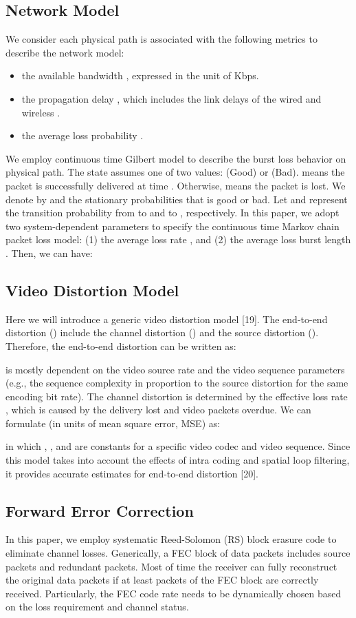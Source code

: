 \documentclass[journal]{IEEEtran}
\begin{document}
\subsection{Network Model}
We consider each physical path  is associated with the following metrics to describe the network model:

\begin{itemize}
  \item the available bandwidth , expressed in the unit of Kbps.
  \item the propagation delay , which includes the link delays of the wired and wireless .
  \item the average loss probability .
\end{itemize}
We employ continuous time Gilbert model to describe the burst loss behavior on physical path. The state  assumes one of two values:  (Good) or  (Bad).  means the packet is successfully delivered at time . Otherwise,  means the packet is lost.
We denote by  and  the stationary probabilities that  is good or bad. Let  and  represent the transition probability from  to  and  to , respectively. In this paper, we adopt two system-dependent parameters to specify the continuous time Markov chain packet loss model: (1) the average loss rate , and (2) the average loss burst length . Then, we can have:



\subsection{Video Distortion Model}
Here we will introduce a generic video distortion model [19]. The end-to-end distortion () include the channel distortion () and the source distortion (). Therefore, the end-to-end distortion can be written as:

 is mostly dependent on the video source rate and the video sequence parameters (e.g., the sequence complexity in proportion to the source distortion for the same encoding bit rate). The channel distortion is determined by the effective loss rate , which is caused by the delivery lost and video packets overdue. We can formulate  (in units of mean square error, MSE) as:

in which , ,  and  are constants for a specific video codec and video sequence. Since this model takes into account the effects of intra coding and spatial loop filtering, it provides accurate estimates for end-to-end distortion [20].
\subsection{Forward Error Correction}
In this paper, we employ systematic Reed-Solomon (RS) block erasure code to eliminate channel losses. Generically, a FEC block of  data packets includes  source packets and  redundant packets. Most of time the receiver can fully reconstruct the original  data packets if at least  packets of the FEC block are correctly received. Particularly, the FEC code rate  needs to be dynamically chosen based on the loss requirement and channel status.
\end{document}
